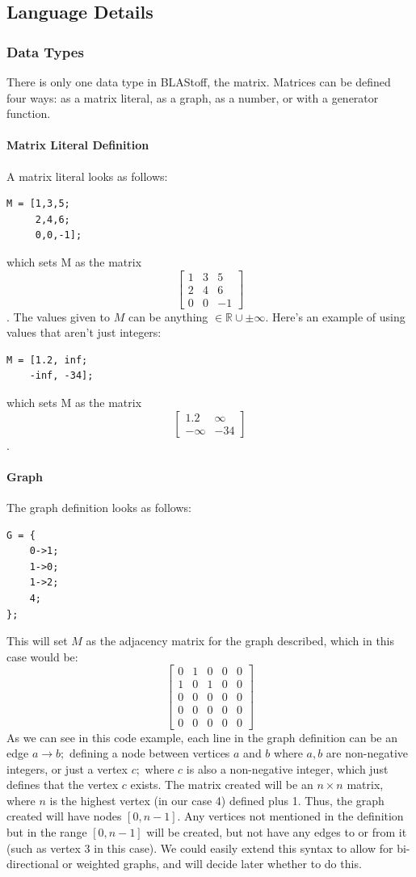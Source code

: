 \subsection{Language Details}
\subsubsection{Data Types}
There is only one data type in BLAStoff, the matrix.  Matrices can be defined four ways: as a matrix literal, as a graph, as a number, or with a generator function.
\paragraph{Matrix Literal Definition}
A matrix literal looks as follows:
\begin{lstlisting}
M = [1,3,5;
     2,4,6;
     0,0,-1];
\end{lstlisting}
which sets M as the matrix $$\begin{bmatrix}1&3&5\\2&4&6\\0&0&-1\end{bmatrix}$$.
The values given to $M$ can be anything $\in \mathbb{R}\cup \pm\infty$.  Here's an example of using values that aren't just integers:
\begin{lstlisting}
M = [1.2, inf;
    -inf, -34];
\end{lstlisting}
which sets M as the matrix $$\begin{bmatrix}1.2&\infty \\ -\infty & -34\end{bmatrix}$$.
\paragraph{Graph}
The graph definition looks as follows:
\begin{lstlisting}
G = {
    0->1;
    1->0;
    1->2;
    4;
};
\end{lstlisting}
This will set $M$ as the adjacency matrix for the graph described, which in this case would be: $$\begin{bmatrix}0&1&0&0&0\\1&0&1&0&0\\0&0&0&0&0\\0&0&0&0&0\\0&0&0&0&0\end{bmatrix}$$  As we can see in this code example, each line in the graph definition can be an edge $a\to b;$ defining a node between vertices $a$ and $b$ where $a,b$ are non-negative integers, or just a vertex $c;$ where $c$ is also a non-negative integer, which just defines that the vertex $c$ exists.  The matrix created will be an $n \times n$ matrix, where $n$ is the highest vertex (in our case 4) defined plus 1.  Thus, the graph created will have nodes $[0,n-1]$.  Any vertices not mentioned in the definition but in the range $[0,n-1]$ will be created, but not have any edges to or from it (such as vertex 3 in this case).  We could easily extend this syntax to allow for bi-directional or weighted graphs, and will decide later whether to do this.

